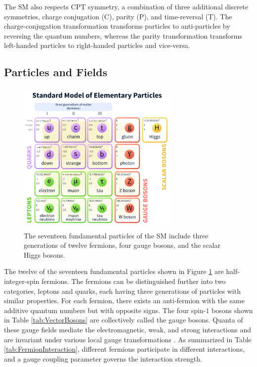 The SM also respects CPT symmetry, a combination of three additional discrete symmetries, charge conjugation (C), parity (P), and time-reversal (T). The charge-conjugation transformation transforms particles to anti-particles by reversing the quantum numbers, whereas the parity transformation transforms left-handed particles to right-handed particles and vice-versa.

\subsection{Particles and Fields}
\label{subsec:Constituents}

\begin{figure}[!htbp]
    \centering
    \includegraphics[width=0.7\textwidth] {figures/Theory/SMparticles.pdf}\hspace{1cm}
    \caption{ The seventeen fundamental particles of the SM include three generations of twelve fermions, four gauge bosons, and the scalar Higgs bosons. \cite{SMFigureWiki}}
    \label{fig:SM}
\end{figure}

The twelve of the seventeen fundamental particles shown in Figure \ref{fig:SM} are half-integer-spin fermions. The fermions can be distinguished further into two categories, leptons and quarks, each having three generations of particles with similar properties. For each fermion, there exists an anti-fermion with the same additive quantum numbers but with opposite signs. The four spin-$1$ bosons shown in Table \ref{tab:VectorBosons} are collectively called the gauge bosons. Quanta of these gauge fields mediate the electromagnetic, weak, and strong interactions and are invariant under various local gauge transformations \cite{Bernabeu2021}. As summarized in Table \ref{tab:FermionInteraction}, different fermions participate in different interactions, and a gauge coupling parameter governs the interaction strength.

